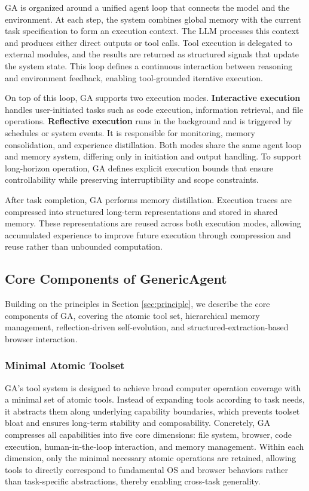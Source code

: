 GA is organized around a unified agent loop that connects the model and the environment. At each step, the system combines global memory with the current task specification to form an execution context. The LLM processes this context and produces either direct outputs or tool calls. Tool execution is delegated to external modules, and the results are returned as structured signals that update the system state. This loop defines a continuous interaction between reasoning and environment feedback, enabling tool-grounded iterative execution.

On top of this loop, GA supports two execution modes. \textbf{Interactive execution} handles user-initiated tasks such as code execution, information retrieval, and file operations. \textbf{Reflective execution} runs in the background and is triggered by schedules or system events. It is responsible for monitoring, memory consolidation, and experience distillation. Both modes share the same agent loop and memory system, differing only in initiation and output handling. To support long-horizon operation, GA defines explicit execution bounds that ensure controllability while preserving interruptibility and scope constraints.

After task completion, GA performs memory distillation. Execution traces are compressed into structured long-term representations and stored in shared memory. These representations are reused across both execution modes, allowing accumulated experience to improve future execution through compression and reuse rather than unbounded computation.

\subsection{Core Components of GenericAgent}
\label{sec:core_design}
Building on the principles in Section \ref{sec:principle}, we describe the core components of GA, covering the atomic tool set, hierarchical memory management, reflection-driven self-evolution, and structured-extraction-based browser interaction.

\subsubsection{Minimal Atomic Toolset}
\label{sec:tools}
GA’s tool system is designed to achieve broad computer operation coverage with a minimal set of atomic tools. Instead of expanding tools according to task needs, it abstracts them along underlying capability boundaries, which prevents toolset bloat and ensures long-term stability and composability. Concretely, GA compresses all capabilities into five core dimensions: file system, browser, code execution, human-in-the-loop interaction, and memory management. Within each dimension, only the minimal necessary atomic operations are retained, allowing tools to directly correspond to fundamental OS and browser behaviors rather than task-specific abstractions, thereby enabling cross-task generality.

